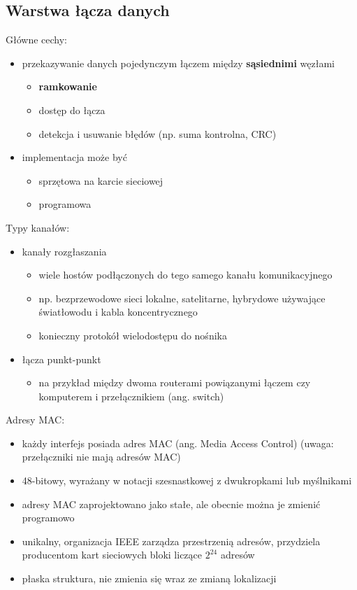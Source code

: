 \subsection{Warstwa łącza danych}
Główne cechy:
\begin{itemize}
    \item przekazywanie danych pojedynczym łączem między \textbf{sąsiednimi} węzłami
    \begin{itemize}
        \item \textbf{ramkowanie}
        \item dostęp do łącza
        \item detekcja i usuwanie błędów (np. suma kontrolna, CRC)
    \end{itemize}
    \item implementacja może być
    \begin{itemize}
        \item sprzętowa na karcie sieciowej
        \item programowa
    \end{itemize}
\end{itemize}

Typy kanałów:
\begin{itemize}
    \item kanały rozgłaszania
    \begin{itemize}
        \item wiele hostów podłączonych do tego samego kanału komunikacyjnego
        \item np. bezprzewodowe sieci lokalne, satelitarne, hybrydowe używające światłowodu i kabla koncentrycznego
        \item konieczny protokół wielodostępu do nośnika
    \end{itemize}
    \item łącza punkt-punkt
    \begin{itemize}
        \item na przykład między dwoma routerami powiązanymi łączem czy komputerem i przełącznikiem (ang. switch)
    \end{itemize}
\end{itemize}

Adresy MAC:
\begin{itemize}
    \item każdy interfejs posiada adres MAC (ang. Media Access Control) (uwaga: przełączniki nie mają adresów MAC)
    \item 48-bitowy, wyrażany w notacji szesnastkowej z dwukropkami lub myślnikami
    \item adresy MAC zaprojektowano jako stałe, ale obecnie można je zmienić programowo
    \item unikalny, organizacja IEEE zarządza przestrzenią adresów, przydziela producentom kart sieciowych bloki liczące $2^{24}$ adresów
    \item płaska struktura, nie zmienia się wraz ze zmianą lokalizacji
\end{itemize}


